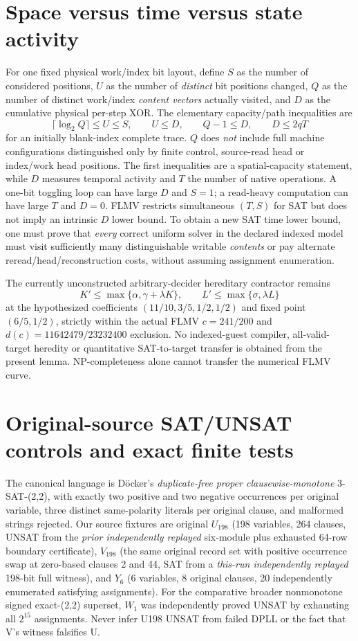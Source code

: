 \documentclass[11pt]{article}
\begin{document}
\section{Space versus time versus state activity}
For one fixed physical work/index bit layout, define $S$ as the number of considered positions, $U$ as the number of \emph{distinct} bit positions changed, $Q$ as the number of distinct work/index \emph{content vectors} actually visited, and $D$ as the cumulative physical per-step XOR. The elementary capacity/path inequalities are
\[
\lceil\log_2 Q\rceil\le U\le S,\qquad U\le D,\qquad Q-1\le D,\qquad D\le2qT
\]
for an initially blank-index complete trace. $Q$ does \emph{not} include full machine configurations distinguished only by finite control, source-read head or index/work head positions. The first inequalities are a spatial-capacity statement, while $D$ measures temporal activity and $T$ the number of native operations. A one-bit toggling loop can have large $D$ and $S=1$; a read-heavy computation can have large $T$ and $D=0$. FLMV restricts simultaneous $(T,S)$ for SAT but does not imply an intrinsic $D$ lower bound. To obtain a new SAT time lower bound, one must prove that \emph{every} correct uniform solver in the declared indexed model must visit sufficiently many distinguishable writable \emph{contents} or pay alternate reread/head/reconstruction costs, without assuming assignment enumeration.

The currently unconstructed arbitrary-decider hereditary contractor remains
\[
K'\le\max\{\alpha,\gamma+\lambda K\},\qquad
L'\le\max\{\sigma,\lambda L\}
\]
at the hypothesized coefficients $(11/10,3/5,1/2,1/2)$ and fixed point $(6/5,1/2)$, strictly within the actual FLMV $c=241/200$ and $d(c)=11642479/23232400$ exclusion. No indexed-guest compiler, all-valid-target heredity or quantitative SAT-to-target transfer is obtained from the present lemma. NP-completeness alone cannot transfer the numerical FLMV curve.

\section{Original-source SAT/UNSAT controls and exact finite tests}
The canonical language is D\"ocker's \emph{duplicate-free proper clausewise-monotone} 3-SAT-(2,2), with exactly two positive and two negative occurrences per original variable, three distinct same-polarity literals per original clause, and malformed strings rejected. Our source fixtures are original $U_{198}$ (198 variables, 264 clauses, UNSAT from the \emph{prior independently replayed} six-module plus exhausted 64-row boundary certificate), $V_{198}$ (the same original record set with positive occurrence swap at zero-based clauses 2 and 44, SAT from a \emph{this-run independently replayed} 198-bit full witness), and $Y_6$ (6 variables, 8 original clauses, 20 independently enumerated satisfying assignments). For the comparative broader nonmonotone signed exact-(2,2) superset, $W_1$ was independently proved UNSAT by exhausting all $2^{15}$ assignments. Never infer U198 UNSAT from failed DPLL or the fact that V's witness falsifies U.
\end{document}
